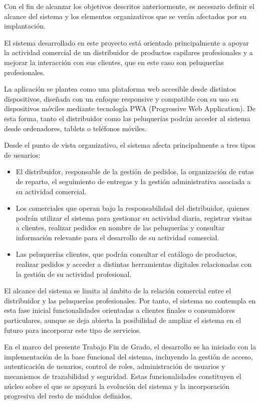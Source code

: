 Con el fin de alcanzar los objetivos descritos anteriormente, es necesario definir el alcance del sistema y los elementos organizativos que se verán afectados por su implantación.

El sistema desarrollado en este proyecto está orientado principalmente a apoyar la actividad comercial de un distribuidor de productos capilares profesionales y a mejorar la interacción con sus clientes, que en este caso son peluquerías profesionales.

La aplicación se plantea como una plataforma web accesible desde distintos dispositivos, diseñada con un enfoque responsive y compatible con su uso en dispositivos móviles mediante tecnología PWA (Progressive Web Application). De esta forma, tanto el distribuidor como las peluquerías podrán acceder al sistema desde ordenadores, tablets o teléfonos móviles.

Desde el punto de vista organizativo, el sistema afecta principalmente a tres tipos de usuarios:

\begin{itemize}
    \item El distribuidor, responsable de la gestión de pedidos, la organización de rutas de reparto, el seguimiento de entregas y la gestión administrativa asociada a su actividad comercial.
    \item Los comerciales que operan bajo la responsabilidad del distribuidor, quienes podrán utilizar el sistema para gestionar su actividad diaria, registrar visitas a clientes, realizar pedidos en nombre de las peluquerías y consultar información relevante para el desarrollo de su actividad comercial.
    \item Las peluquerías clientes, que podrán consultar el catálogo de productos, realizar pedidos y acceder a distintas herramientas digitales relacionadas con la gestión de su actividad profesional.
\end{itemize}

El alcance del sistema se limita al ámbito de la relación comercial entre el distribuidor y las peluquerías profesionales. Por tanto, el sistema no contempla en esta fase inicial funcionalidades orientadas a clientes finales o consumidores particulares, aunque se deja abierta la posibilidad de ampliar el sistema en el futuro para incorporar este tipo de servicios.

En el marco del presente Trabajo Fin de Grado, el desarrollo se ha iniciado con la implementación de la base funcional del sistema, incluyendo la gestión de acceso, autenticación de usuarios, control de roles, administración de usuarios y mecanismos de trazabilidad y seguridad. Estas funcionalidades constituyen el núcleo sobre el que se apoyará la evolución del sistema y la incorporación progresiva del resto de módulos definidos.